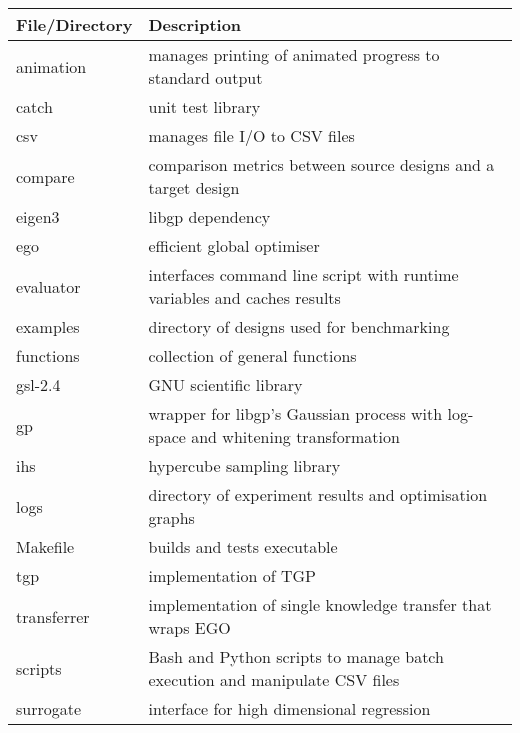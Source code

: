 \documentclass[10pt,a4paper]{article}
\begin{document}
\noindent
\begin{tabularx}{\textwidth}{|l|X|}
	\hline
	File/Directory & Description\\\hline
	animation & manages printing of animated progress to standard output\\\hline
	catch & unit test library\\\hline
	csv & manages file I/O to CSV files\\\hline
	compare & comparison metrics between source designs and a target design\\\hline
	eigen3 & libgp dependency\\\hline
	ego & efficient global optimiser\\\hline
	evaluator & interfaces command line script with runtime variables and caches results\\\hline
	examples & directory of designs used for benchmarking\\\hline
	functions & collection of general functions\\\hline
	gsl-2.4 & GNU scientific library\\\hline
	gp & wrapper for libgp's Gaussian process with log-space and whitening transformation\\\hline
	ihs & hypercube sampling library\\\hline
	logs & directory of experiment results and optimisation graphs\\\hline
	Makefile & builds and tests executable\\\hline
	tgp & implementation of TGP\\\hline
	transferrer & implementation of single knowledge transfer that wraps EGO\\\hline
	scripts & Bash and Python scripts to manage batch execution and manipulate CSV files\\\hline
	surrogate & interface for high dimensional regression\\\hline
\end{tabularx}
\end{document}
